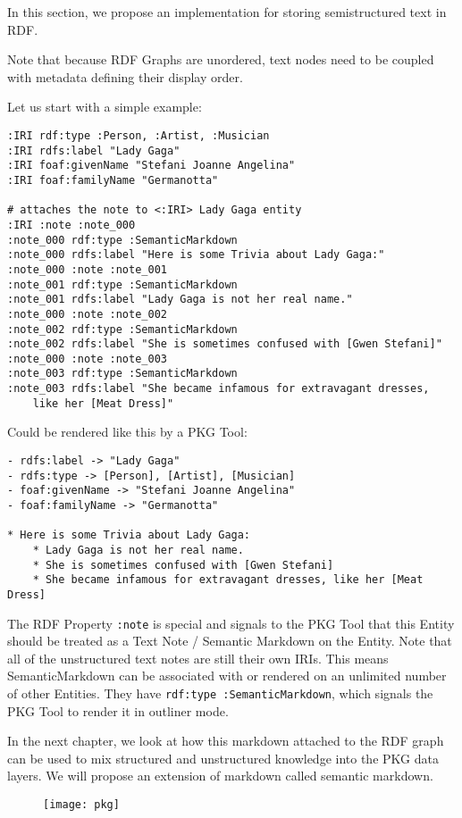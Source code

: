 In this section, we propose an implementation for storing semistructured text in RDF.

Note that because RDF Graphs are unordered, text nodes need to be coupled with metadata defining their display order.

Let us start with a simple example:

\begin{verbatim}
:IRI rdf:type :Person, :Artist, :Musician
:IRI rdfs:label "Lady Gaga"
:IRI foaf:givenName "Stefani Joanne Angelina"
:IRI foaf:familyName "Germanotta"

# attaches the note to <:IRI> Lady Gaga entity
:IRI :note :note_000                
:note_000 rdf:type :SemanticMarkdown
:note_000 rdfs:label "Here is some Trivia about Lady Gaga:"
:note_000 :note :note_001
:note_001 rdf:type :SemanticMarkdown
:note_001 rdfs:label "Lady Gaga is not her real name."
:note_000 :note :note_002
:note_002 rdf:type :SemanticMarkdown
:note_002 rdfs:label "She is sometimes confused with [Gwen Stefani]"
:note_000 :note :note_003
:note_003 rdf:type :SemanticMarkdown
:note_003 rdfs:label "She became infamous for extravagant dresses, 
    like her [Meat Dress]"
\end{verbatim}


Could be rendered like this by a PKG Tool:

\begin{verbatim}
- rdfs:label -> "Lady Gaga"
- rdfs:type -> [Person], [Artist], [Musician]
- foaf:givenName -> "Stefani Joanne Angelina"
- foaf:familyName -> "Germanotta"

* Here is some Trivia about Lady Gaga:
    * Lady Gaga is not her real name.
    * She is sometimes confused with [Gwen Stefani]
    * She became infamous for extravagant dresses, like her [Meat Dress]
\end{verbatim}


The RDF Property \verb|:note| is special and signals to the PKG Tool that this Entity should be treated as a Text Note / Semantic Markdown on the Entity. Note that all of the unstructured text notes are still their own IRIs. This means SemanticMarkdown can be associated with or rendered on an unlimited number of other Entities. They have \verb|rdf:type :SemanticMarkdown|, which signals the PKG Tool to render it in outliner mode.

In the next chapter, we look at how this markdown attached to the RDF graph can be used to mix structured and unstructured knowledge into the PKG data layers. We will propose an extension of markdown called semantic markdown.

\begin{figure}[H]
    \texttt{[image: pkg]}
\end{figure}